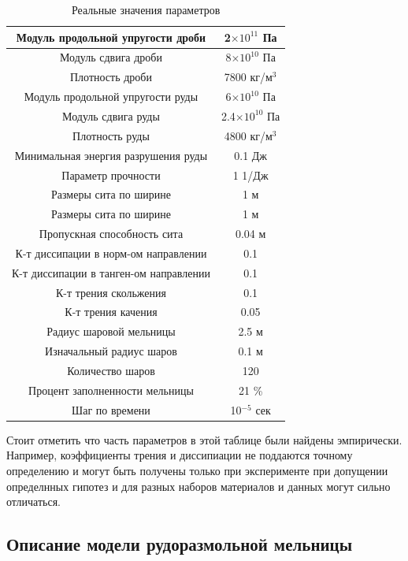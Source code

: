 \documentclass[utf8x, 14pt, oneside, a4paper]{article}
\begin{document}
\begin{table}[H]
\caption{Реальные значения параметров}
\begin{tabular}{|c|c|}
\hline
Модуль продольной упругости дроби & 2$\times 10^{11}$ Па  \\ 
\hline
Модуль сдвига дроби & 8$\times 10^{10}$ Па \\  
\hline
Плотность дроби & 7800 кг/м$^3$ \\
\hline
Модуль продольной упругости руды & 6$\times 10^{10}$ Па  \\ 
\hline
Модуль сдвига руды & 2.4$\times 10^{10}$ Па \\  
\hline
Плотность руды & 4800 кг/м$^3$ \\
\hline
Минимальная энергия разрушения руды & 0.1 Дж \\
\hline
Параметр прочности & 1 1/Дж \\
\hline
Размеры сита по ширине & 1 м \\
\hline
Размеры сита по ширине & 1 м \\
\hline
Пропускная способность сита & 0.04 м \\
\hline
К-т диссипации в норм-ом направлении & 0.1 \\
\hline
К-т диссипации в танген-ом направлении & 0.1 \\
\hline
К-т трения скольжения & 0.1 \\
\hline
К-т трения качения & 0.05 \\
\hline
Радиус шаровой мельницы & 2.5 м \\
\hline
Изначальный радиус шаров & 0.1 м \\
\hline
Количество шаров & 120 \\
\hline
Процент заполненности мельницы & 21 \% \\
\hline
Шаг по времени & 10$^{-5}$ сек \\
\hline
\end{tabular}
\end{table}

Стоит отметить что часть параметров в этой таблице были найдены эмпирически. 
Например, коэффициенты трения и диссипиации не поддаются точному определению и могут быть получены только при эксперименте при допущении определнных гипотез и для разных наборов материалов и данных могут сильно отличаться.

\subsection{Описание модели рудоразмольной мельницы}
\end{document}
